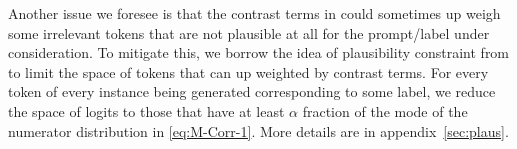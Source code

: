 Another issue we foresee is that the contrast terms in \corrsyn{} could sometimes up weigh some irrelevant tokens that are not plausible at all for the prompt/label under consideration. To mitigate this, we borrow the idea of plausibility constraint from \cite{li2023contrastive, o2023contrastive} to limit the space of tokens that can up weighted by contrast terms. For every token of every instance being generated corresponding to some label, we reduce the space of logits to those that have at least $\alpha$ fraction of the mode of the numerator distribution in \eqref{eq:M-Corr-1}. More details are in appendix~\ref{sec:plaus}.


 